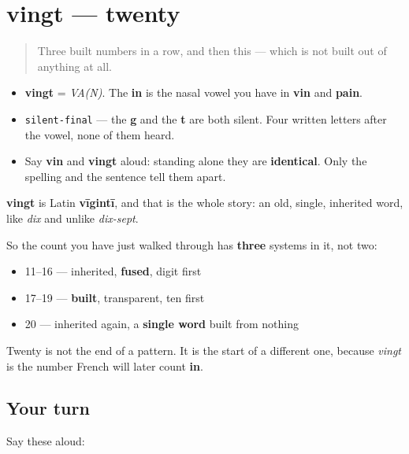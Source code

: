 \section[vingt]{vingt — twenty}

\label{lesson:FR-C12-vingt}



\begin{quote}
Three built numbers in a row, and then this — which is not built out of anything at all.
\end{quote}

\begin{sounds}
\begin{itemize}
\raggedright
  \item \textbf{vingt} = \emph{VA(N)}. The \textbf{in} is the nasal vowel you have in \textbf{vin} and \textbf{pain}.
  \item \texttt{silent-final} — the \textbf{g} and the \textbf{t} are both silent. Four written letters after the vowel, none of them heard.
  \item Say \textbf{vin} and \textbf{vingt} aloud: standing alone they are \textbf{identical}. Only the spelling and the sentence tell them apart.
\end{itemize}
\end{sounds}

\begin{cousinweb}
\textbf{vingt} is Latin \textbf{vīgintī}, and that is the whole story: an old, single, inherited word, like \emph{dix} and unlike \emph{dix-sept}.

So the count you have just walked through has \textbf{three} systems in it, not two:

\begin{itemize}
\raggedright
  \item 11–16 — inherited, \textbf{fused}, digit first
  \item 17–19 — \textbf{built}, transparent, ten first
  \item 20 — inherited again, a \textbf{single word} built from nothing
\end{itemize}

Twenty is not the end of a pattern. It is the start of a different one, because \emph{vingt} is the number French will later count \textbf{in}.
\end{cousinweb}

\subsection*{Your turn}
Say these aloud:

